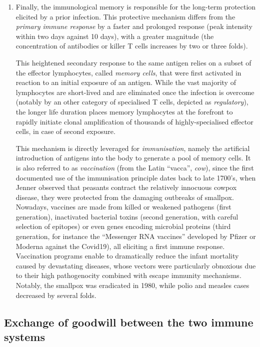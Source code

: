 \begin{enumerate}[label=(\alph*)]
\item[Immunological Memory] 
Finally, the immunological memory is responsible for the long-term protection elicited by a prior infection. This protective mechanism differs from the \textit{primary immune response} by a faster and prolonged response (peak intensity within two days against 10 days), with a greater magnitude (the concentration of antibodies or killer T cells increases by two or three folds). 

This heightened secondary response to the same antigen relies on a subset of the effector lymphocytes, called \textit{memory cells}, that were first activated in reaction to an initial exposure of an antigen. While the vast majority of lymphocytes are short-lived and are eliminated once the infection is overcome (notably by an other category of specialised T cells, depicted as \textit{regulatory}), the longer life duration places memory lymphocytes at the forefront to rapidly initiate clonal amplification of thousands of highly-specialised effector cells, in case of second exposure. 

This mechanism is directly leveraged for \textit{immunisation}, namely the artificial introduction of antigens into the body to generate a pool of memory cells. It is also referred to as \textit{vaccination} (from the Latin \enquote{vacca}, \textit{cow}), since the first documented use of the immunisation principle dates back to late 1700's, when Jenner observed that peasants contract the relatively innocuous cowpox disease, they were protected from the damaging outbreaks of smallpox. Nowadays, vaccines are made from killed or weakened pathogens (first generation), inactivated bacterial toxins (second generation, with careful selection of epitopes) or
even genes encoding microbial proteins (third generation, for instance the \enquote{Messenger RNA vaccines} developed by Pfizer or Moderna against the Covid19), all eliciting a first immune response. Vaccination programs enable to dramatically reduce the infant mortality caused by devastating diseases, whose vectors were particularly obnoxious due to their high pathogenocity combined with escape immunity mechanisms. Notably, the smallpox was eradicated in 1980, while polio and measles cases decreased by several folds.

\end{enumerate}


\subsection{Exchange of goodwill between the two immune systems}
\label{subsec:collab-innate-adaptive}

